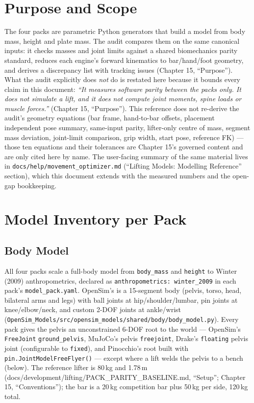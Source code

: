 \documentclass[11pt,a4paper]{article}
\begin{document}
\section{Purpose and Scope}
The four packs are parametric Python generators that build a
model from body mass, height and plate mass. The audit compares them on the
same canonical inputs: it checks masses and joint limits against a shared
biomechanics parity standard, reduces each engine's forward kinematics to
bar/hand/foot geometry, and derives a discrepancy list with tracking issues
(Chapter 15, ``Purpose''). What the audit explicitly does \emph{not} do is
restated here because it bounds every claim in this document: \emph{``It
measures software parity between the packs only. It does not simulate a
lift, and it does not compute joint moments, spine loads or muscle
forces.''} (Chapter 15, ``Purpose''). This reference does not re-derive the
audit's geometry equations (bar frame, hand-to-bar offsets, placement
independent pose summary, same-input parity, lifter-only centre of mass,
segment mass deviation, joint-limit comparison, grip width, start pose,
reference FK) --- those ten equations and their tolerances are Chapter 15's
governed content and are only cited here by name. The user-facing summary of
the same material lives in \texttt{docs/help/movement\_optimizer.md}
(``Lifting Models: Modelling Reference'' section), which this document
extends with the measured numbers and the open-gap bookkeeping.

\section{Model Inventory per Pack}

\subsection{Body Model}
All four packs scale a full-body model from \texttt{body\_mass} and
\texttt{height} to Winter (2009) anthropometrics, declared as
\texttt{anthropometrics: winter\_2009} in each pack's \texttt{model\_pack.yaml}.
OpenSim's is a 15-segment body (pelvis, torso, head, bilateral arms and legs)
with ball joints at hip/shoulder/lumbar, pin joints at knee/elbow/neck, and
custom 2-DOF joints at ankle/wrist
(\texttt{OpenSim\_Models/src/opensim\_models/shared/body/body\_model.py}).
Every pack gives the pelvis an unconstrained 6-DOF root to the world ---
OpenSim's \texttt{FreeJoint} \texttt{ground\_pelvis}, MuJoCo's pelvis
\texttt{freejoint}, Drake's \texttt{floating} pelvis joint (configurable to
\texttt{fixed}), and Pinocchio's root built with
\texttt{pin.JointModelFreeFlyer()} --- except where a lift welds the pelvis to
a bench (below). The reference lifter is 80\,kg and 1.78\,m
(docs/development/lifting/PACK\_PARITY\_BASELINE.md, ``Setup''; Chapter 15,
``Conventions''); the bar is a 20\,kg competition bar plus 50\,kg per side,
120\,kg total.
\end{document}
